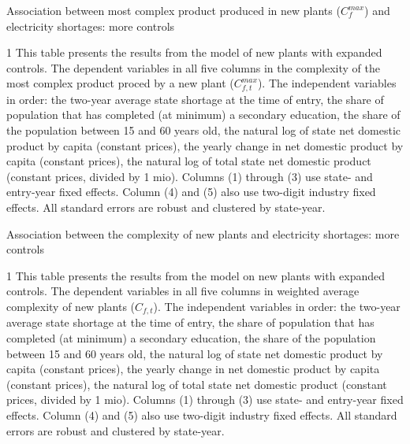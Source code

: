 \documentclass[11pt]{article}
\begin{document}
\begin{table} 
	\begin{center}
		\begin{threeparttable}
			\caption{Association between most complex product produced in new plants ($C^{max}_{f}$) and electricity shortages: more controls}
			\label{tab:entry_max_max}
			
			\begin{tablenotes} \footnotesize 
			\item[1] This table presents the results from the model of new plants with expanded controls. The dependent variables in all five columns in the complexity of the most complex product proced by a new plant ($C^{max}_{f,t}$). The independent variables in order: the two-year average state shortage at the time of entry, the share of population that has completed (at minimum) a secondary education, the share of the population between 15 and 60 years old, the natural log of state net domestic product by capita (constant prices), the yearly change in net domestic product by capita (constant prices), the natural log of total state net domestic product (constant prices, divided by 1 mio). Columns (1) through (3) use state- and entry-year fixed effects. Column (4) and (5) also use two-digit industry fixed effects. All standard errors are robust and clustered by state-year.
			\end{tablenotes}
		\end{threeparttable}
	\end{center}
\end{table}   


\begin{table} 
	\begin{center}
		\begin{threeparttable}
			\caption{Association between the complexity of new plants and electricity shortages: more controls}
			\label{tab:entry_max_avg}
			
			\begin{tablenotes} \footnotesize 
			\item[1] This table presents the results from the model on new plants with expanded controls. The dependent variables in all five columns in weighted average complexity of new plants ($C_{f,t}$). The independent variables in order: the two-year average state shortage at the time of entry, the share of population that has completed (at minimum) a secondary education, the share of the population between 15 and 60 years old, the natural log of state net domestic product by capita (constant prices), the yearly change in net domestic product by capita (constant prices), the natural log of total state net domestic product (constant prices, divided by 1 mio). Columns (1) through (3) use state- and entry-year fixed effects. Column (4) and (5) also use two-digit industry fixed effects. All standard errors are robust and clustered by state-year.
			\end{tablenotes}
		\end{threeparttable}
	\end{center}
\end{table}   
\end{document}
